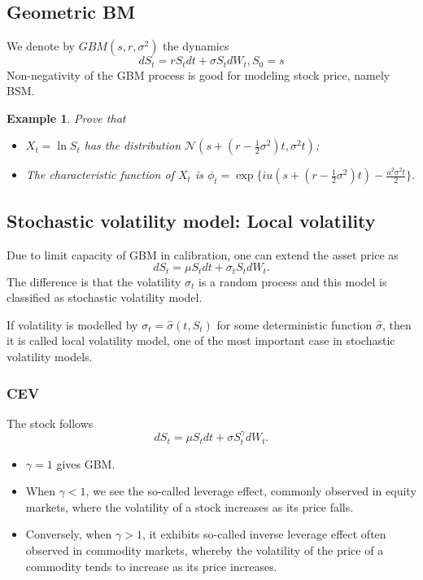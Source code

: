 \documentclass{article}
\newtheorem{example}{Example}
\begin{document}
\subsection{Geometric BM}
We denote by $GBM(s, r, \sigma^2)$ the dynamics
$$d S_t = r S_t dt + \sigma S_t dW_t, S_{0} = s$$
Non-negativity of the GBM process is good for modeling stock price, namely BSM.
\begin{example}
\label{exm:gbm01}
Prove that
\begin{itemize}
\item
$X_t = \ln S_t$ has the distribution $\mathcal N(s + (r-\frac 1 2 \sigma^2)t, \sigma^2 t)$;
\item The characteristic function of $X_t$ is
$\phi_t = \exp \{iu (s + (r-\frac 1 2 \sigma^2)t) - \frac{u^2 \sigma^2 t}{2}\}.$
\end{itemize}
\end{example}

\subsection{Stochastic volatility model: Local volatility}
Due to limit capacity of GBM in calibration, one can extend the asset price as
$$d S_t = \mu S_t dt + \sigma_t S_t dW_t.$$
The difference is that the volatility $\sigma_t$ is a random process and this model is classified as stochastic volatility model.

If volatility is modelled by $\sigma_t = \hat \sigma(t, S_t)$ for some deterministic function $\hat \sigma$, then it is called local volatility model, one of the most important case in stochastic volatility models.
\subsubsection{CEV}
The stock follows
$$d S_{t} = \mu S_{t} dt + \sigma S_{t}^{\gamma} dW_{t}.$$
\begin{itemize}
\item $\gamma = 1$ gives GBM.
 \item  When $\gamma <1$,  we see the so-called leverage effect, commonly observed in equity markets, where the volatility of a stock increases as its price falls. 
 \item Conversely, when $\gamma >1$, it exhibits so-called inverse leverage effect often observed in commodity markets, whereby the volatility of the price of a commodity tends to increase as its price increases.
\end{itemize}
\end{document}

